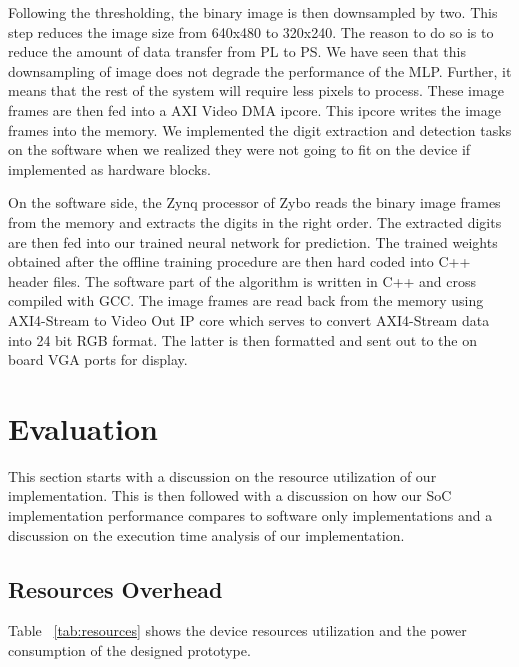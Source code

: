 \documentclass[sigconf]{acmart}
\theoremstyle{plain}
\theoremstyle{remark}
\begin{document}
Following the thresholding, the binary image is then downsampled by two. This step reduces the image size from 640x480 to 320x240. The reason to do so is to reduce the amount of data transfer from PL to PS. We have seen that this downsampling of image does not degrade the performance of the MLP. Further, it means that the rest of the system will require less pixels to process. These image frames are then fed into a AXI Video DMA ipcore. This ipcore writes the image frames into the memory. We implemented the digit extraction and detection tasks on the software when we realized they were not going to fit on the device if implemented as hardware blocks.

On the software side, the Zynq processor of Zybo reads the binary image frames from the memory and extracts the digits in the right order. The extracted digits are then fed into our trained neural network for prediction. The trained weights obtained after the offline training procedure are then hard coded into C++ header files. The software part of the algorithm is written in C++ and cross compiled with GCC.
The image frames are read back from the memory using AXI4-Stream to Video Out IP core which serves to convert AXI4-Stream data into 24 bit RGB format. The latter is then formatted and sent out to the on board VGA ports for display. 

\section{Evaluation} \label{sec:results}

This section starts with a discussion on the resource utilization of our implementation. This is then followed with a discussion on how our SoC implementation performance compares to software only implementations and a discussion on the execution time analysis of our implementation. 

\subsection{Resources Overhead}


Table ~\ref{tab:resources} shows the device resources utilization and the power consumption of the designed prototype.
\end{document}
